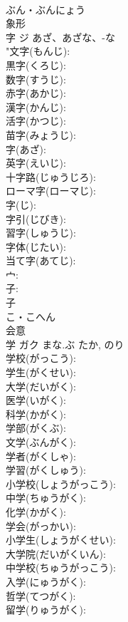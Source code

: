 \documentclass[8pt]{extreport}
\begin{document}
\begin{CJK}{UTF8}{min}
\\	ぶん・ぶんにょう	
\\	象形 
\\	字	ジ	あざ、あざな、-な		
\\	"文字(もんじ): 
\\	黒字(くろじ): 
\\	数字(すうじ): 
\\	赤字(あかじ): 
\\	漢字(かんじ): 
\\	活字(かつじ): 
\\	苗字(みょうじ): 
\\	字(あざ): 
\\	英字(えいじ): 
\\	十字路(じゅうじろ): 
\\	ローマ字(ローマじ): 
\\	字(じ): 
\\	字引(じびき): 
\\	習字(しゅうじ): 
\\	字体(じたい): 
\\	当て字(あてじ): 
\\	宀: 
\\	子: 
\\	子	
\\	こ・こへん	
\\	会意 
\\	学	ガク	まな.ぶ	たか, のり	
\\	学校(がっこう): 
\\	学生(がくせい): 
\\	大学(だいがく): 
\\	医学(いがく): 
\\	科学(かがく): 
\\	学部(がくぶ): 
\\	文学(ぶんがく): 
\\	学者(がくしゃ): 
\\	学習(がくしゅう): 
\\	小学校(しょうがっこう): 
\\	中学(ちゅうがく): 
\\	化学(かがく): 
\\	学会(がっかい): 
\\	小学生(しょうがくせい): 
\\	大学院(だいがくいん): 
\\	中学校(ちゅうがっこう): 
\\	入学(にゅうがく): 
\\	哲学(てつがく): 
\\	留学(りゅうがく): 

\end{CJK}
\end{document}
